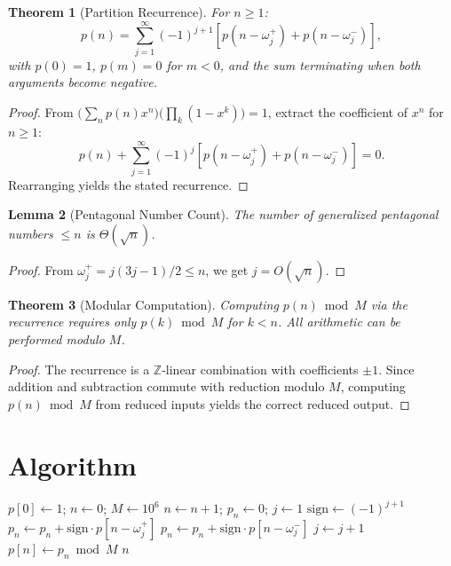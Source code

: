 \documentclass[11pt]{article}
\newtheorem{theorem}{Theorem}
\newtheorem{lemma}[theorem]{Lemma}
\begin{document}
\begin{theorem}[Partition Recurrence]
For $n \geq 1$:
\[
p(n) = \sum_{j=1}^{\infty} (-1)^{j+1} \left[p\!\left(n - \omega_j^{+}\right) + p\!\left(n - \omega_j^{-}\right)\right],
\]
with $p(0) = 1$, $p(m) = 0$ for $m < 0$, and the sum terminating when both arguments become negative.
\end{theorem}

\begin{proof}
From $\bigl(\sum_n p(n)x^n\bigr)\bigl(\prod_k (1-x^k)\bigr) = 1$, extract the coefficient of $x^n$ for $n \geq 1$:
\[
p(n) + \sum_{j=1}^{\infty} (-1)^j [p(n - \omega_j^{+}) + p(n - \omega_j^{-})] = 0.
\]
Rearranging yields the stated recurrence.
\end{proof}

\begin{lemma}[Pentagonal Number Count]
The number of generalized pentagonal numbers $\leq n$ is $\Theta(\sqrt{n})$.
\end{lemma}

\begin{proof}
From $\omega_j^{+} = j(3j-1)/2 \leq n$, we get $j = O(\sqrt{n})$.
\end{proof}

\begin{theorem}[Modular Computation]
Computing $p(n) \bmod M$ via the recurrence requires only $p(k) \bmod M$ for $k < n$. All arithmetic can be performed modulo $M$.
\end{theorem}

\begin{proof}
The recurrence is a $\mathbb{Z}$-linear combination with coefficients $\pm 1$. Since addition and subtraction commute with reduction modulo $M$, computing $p(n) \bmod M$ from reduced inputs yields the correct reduced output.
\end{proof}

\section{Algorithm}

\begin{algorithm}[H]
\caption{Find least $n$ with $p(n) \equiv 0 \pmod{10^6}$}
\begin{algorithmic}[1]
\STATE $p[0] \gets 1$; $n \gets 0$; $M \gets 10^6$
\REPEAT
    \STATE $n \gets n + 1$; $p_n \gets 0$; $j \gets 1$
        \STATE $\text{sign} \gets (-1)^{j+1}$
            \STATE $p_n \gets p_n + \text{sign} \cdot p[n - \omega_j^{+}]$
        \ENDIF
            \STATE $p_n \gets p_n + \text{sign} \cdot p[n - \omega_j^{-}]$
        \ENDIF
        \STATE $j \gets j + 1$
    \ENDWHILE
    \STATE $p[n] \gets p_n \bmod M$
\RETURN $n$
\end{algorithmic}
\end{algorithm}
\end{document}
